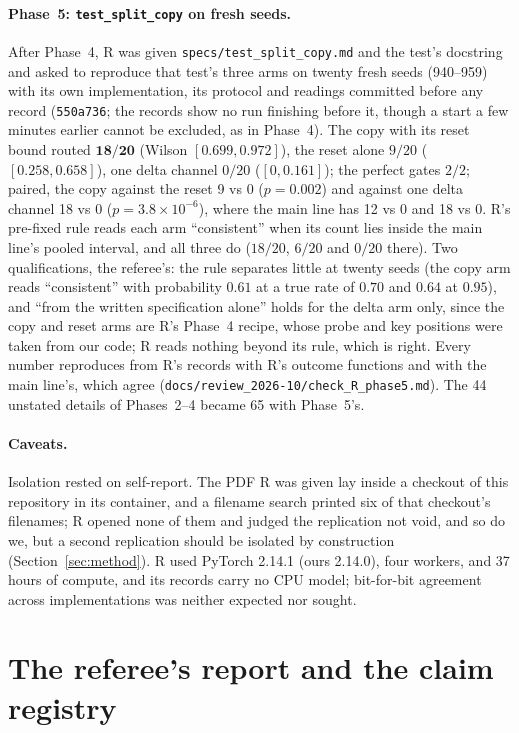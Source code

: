\documentclass[11pt]{article}
\begin{document}
\paragraph{Phase~5: \texttt{test\_split\_copy} on fresh seeds.} After Phase~4, R was given \texttt{specs/test\_split\_copy.md} and the test's docstring and asked to reproduce that test's three arms on twenty fresh seeds (940--959) with its own implementation, its protocol and readings committed before any record (\texttt{550a736}; the records show no run finishing before it, though a start a few minutes earlier cannot be excluded, as in Phase~4). The copy with its reset bound routed $\mathbf{18/20}$ (Wilson $[0.699, 0.972]$), the reset alone $9/20$ ($[0.258, 0.658]$), one delta channel $0/20$ ($[0, 0.161]$); the perfect gates $2/2$; paired, the copy against the reset 9 vs 0 ($p = 0.002$) and against one delta channel 18 vs 0 ($p = 3.8\times10^{-6}$), where the main line has 12 vs 0 and 18 vs 0. R's pre-fixed rule reads each arm ``consistent'' when its count lies inside the main line's pooled interval, and all three do ($18/20$, $6/20$ and $0/20$ there). Two qualifications, the referee's: the rule separates little at twenty seeds (the copy arm reads ``consistent'' with probability $0.61$ at a true rate of $0.70$ and $0.64$ at $0.95$), and ``from the written specification alone'' holds for the delta arm only, since the copy and reset arms are R's Phase~4 recipe, whose probe and key positions were taken from our code; R reads nothing beyond its rule, which is right. Every number reproduces from R's records with R's outcome functions and with the main line's, which agree (\texttt{docs/review\_2026-10/check\_R\_phase5.md}). The 44 unstated details of Phases~2--4 became 65 with Phase~5's.

\paragraph{Caveats.} Isolation rested on self-report. The PDF R was given lay inside a checkout of this repository in its container, and a filename search printed six of that checkout's filenames; R opened none of them and judged the replication not void, and so do we, but a second replication should be isolated by construction (Section~\ref{sec:method}). R used PyTorch 2.14.1 (ours 2.14.0), four workers, and 37 hours of compute, and its records carry no CPU model; bit-for-bit agreement across implementations was neither expected nor sought.

\section{The referee's report and the claim registry}
\label{sec:referee}
\end{document}
